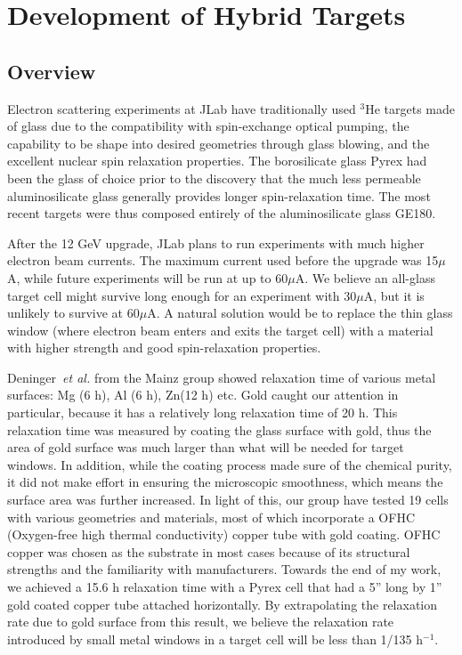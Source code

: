 \chapter{Development of Hybrid Targets}
\label{chap5}

\section{Overview}

Electron scattering experiments at JLab have traditionally used $^{3}$He targets made of glass due to the compatibility with spin-exchange optical pumping, the capability to be shape into desired geometries through glass blowing, and the excellent nuclear spin relaxation properties. The borosilicate glass Pyrex had been the glass of choice prior to the discovery that the much less permeable aluminosilicate glass generally provides longer spin-relaxation time. The most recent targets were thus composed entirely of the aluminosilicate glass GE180.

After the 12 GeV upgrade, JLab plans to run experiments with much higher electron beam currents. The maximum current used before the upgrade was 15$\mu$A, while future experiments will be run at up to 60$\mu$A. We believe an all-glass target cell might survive long enough for an experiment with 30$\mu$A, but it is unlikely to survive at 60$\mu$A. A natural solution would be to replace the thin glass window (where electron beam enters and exits the target cell) with a material with higher strength and good spin-relaxation properties. 

Deninger~\emph{et al.} from the Mainz group showed relaxation time of various metal surfaces: Mg (6 h), Al (6 h), Zn(12 h) etc. Gold caught our attention in particular, because it has a relatively long relaxation time of 20 h. This relaxation time was measured by coating the glass surface with gold, thus the area of gold surface was much larger than what will be needed for target windows. In addition, while the coating process made sure of the chemical purity, it did not make effort in ensuring the microscopic smoothness, which means the surface area was further increased. In light of this, our group have tested 19 cells with various geometries and materials, most of which incorporate a OFHC (Oxygen-free high thermal conductivity) copper tube with gold coating. OFHC copper was chosen as the substrate in most cases because of its structural strengths and the familiarity with manufacturers. Towards the end of my work, we achieved a 15.6 h relaxation time with a Pyrex cell that had a 5'' long by 1'' gold coated copper tube attached horizontally. By extrapolating the relaxation rate due to gold surface from this result, we believe the relaxation rate introduced by small metal windows in a target cell will be less than 1/135 h$^{-1}$.

